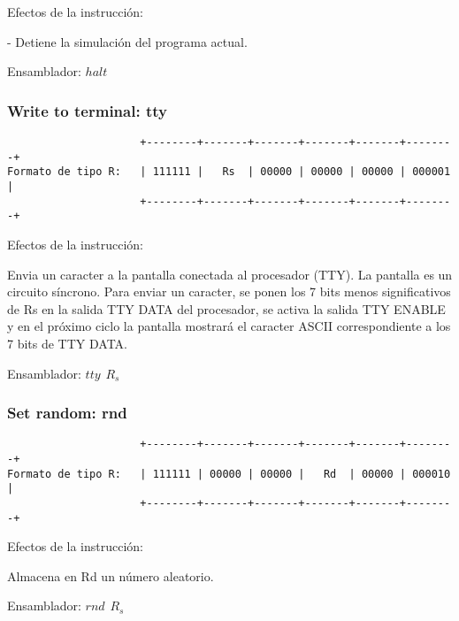 \documentclass[letterpaper,11pt]{scrartcl}
\begin{document}
Efectos de la instrucción: 

- Detiene la simulación del programa actual.

Ensamblador: $halt$


\subsubsection*{Write to terminal: \textbf{tty}}

\begin{verbatim}
                     +--------+-------+-------+-------+-------+--------+ 
Formato de tipo R:   | 111111 |   Rs  | 00000 | 00000 | 00000 | 000001 | 
                     +--------+-------+-------+-------+-------+--------+ 
\end{verbatim}

Efectos de la instrucción: 

Envia un caracter a la pantalla  conectada al procesador (TTY). La pantalla es un circuito síncrono.
Para enviar un caracter, se ponen los 7 bits menos significativos de Rs en la salida TTY DATA del procesador, 
se activa la salida TTY ENABLE y en el próximo ciclo la pantalla mostrará el caracter ASCII correspondiente 
a los 7 bits de TTY DATA.

Ensamblador: $tty\hspace{5pt}R_s$


\subsubsection*{Set random: \textbf{rnd}}

\begin{verbatim}
                     +--------+-------+-------+-------+-------+--------+ 
Formato de tipo R:   | 111111 | 00000 | 00000 |   Rd  | 00000 | 000010 | 
                     +--------+-------+-------+-------+-------+--------+ 
\end{verbatim}

Efectos de la instrucción: 

Almacena en Rd un número aleatorio.

Ensamblador: $rnd\hspace{5pt}R_s$

\end{document}
